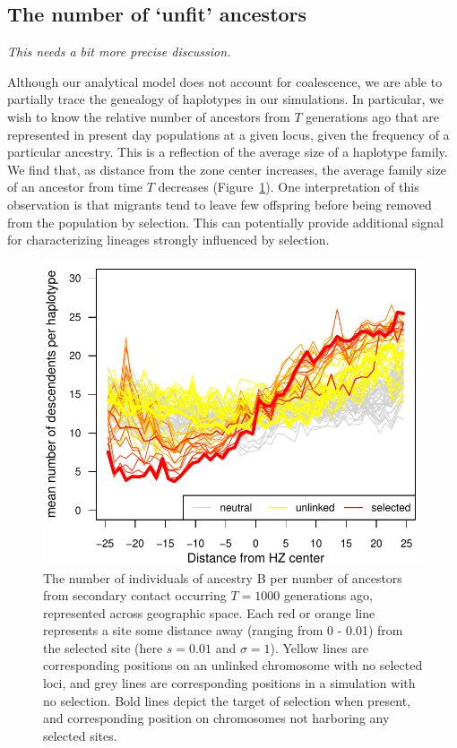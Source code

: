 \documentclass[11pt,letterpaper]{article}
\newcommand{\plr}[1]{{\em \color{blue} #1}}
\begin{document}
\subsection*{The number of `unfit' ancestors}

\plr{This needs a bit more precise discussion.}

Although our analytical model does not account for coalescence, we are able to partially trace the genealogy of haplotypes in our simulations. In particular, we wish to know the relative number of ancestors from $T$ generations ago that are represented in present day populations at a given locus, given the frequency of a particular ancestry. This is a reflection of the average size of a haplotype family. We find that, as distance from the zone center increases, the average family size of an ancestor from time $T$ decreases (Figure~\ref{Fig:family_size}). One interpretation of this observation is that migrants tend to leave few offspring before being removed from the population by selection. This can potentially provide additional signal for characterizing lineages strongly influenced by selection.

\begin{figure}
\includegraphics{figs/number_of_ancestors_tau1000}
\caption{The number of individuals of ancestry B per number of ancestors from secondary contact occurring $T=1000$ generations ago, represented across geographic space. Each red or orange line represents a site some distance away (ranging from 0 - 0.01) from the selected site (here $s=0.01$ and $\sigma=1$). Yellow lines are corresponding positions on an unlinked chromosome with no selected loci, and grey lines are corresponding positions in a simulation with no selection.  Bold lines depict the target of selection when present, and corresponding position on chromosomes not harboring any selected sites.}\label{Fig:family_size}
\end{figure}
\end{document}
